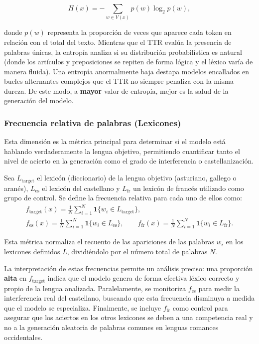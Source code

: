 \[
H(x) = -\sum_{w \in V(x)} p(w)\log_2 p(w),
\]

donde $p(w)$ representa la proporción de veces que aparece cada token en relación con el total del texto. Mientras que el TTR evalúa la presencia de palabras únicas, la entropía analiza si su distribución probabilística es natural (donde los artículos y preposiciones se repiten de forma lógica y el léxico varía de manera fluida). Una entropía anormalmente baja destapa modelos encallados en bucles alternantes complejos que el TTR no siempre penaliza con la misma dureza. De este modo, a \textbf{mayor} valor de entropía, mejor es la salud de la generación del modelo.

\subsubsection{Frecuencia relativa de palabras (Lexicones)}

Esta dimensión es la métrica principal para determinar si el modelo está hablando verdaderamente la lengua objetivo, permitiendo cuantificar tanto el nivel de acierto en la generación como el grado de interferencia o castellanización.

Sea $L_{\text{target}}$ el lexicón (diccionario) de la lengua objetivo (asturiano, gallego o aranés), $L_{\text{es}}$ el lexicón del castellano y $L_{\text{fr}}$ un lexicón de francés utilizado como grupo de control. Se define la frecuencia relativa para cada uno de ellos como:
\begin{gather*}
f_{\text{target}}(x) = \frac{1}{N}\sum_{i=1}^N \mathbf{1}\{w_i \in L_{\text{target}}\}, \\
f_{\text{es}}(x) = \frac{1}{N}\sum_{i=1}^N \mathbf{1}\{w_i \in L_{\text{es}}\}, \qquad
f_{\text{fr}}(x) = \frac{1}{N}\sum_{i=1}^N \mathbf{1}\{w_i \in L_{\text{fr}}\}.
\end{gather*}

Esta métrica normaliza el recuento de las apariciones de las palabras $w_i$ en los lexicones definidos $L$, dividiéndolo por el número total de palabras $N$.

La interpretación de estas frecuencias permite un análisis preciso: una proporción \textbf{alta} en $f_{\text{target}}$ indica que el modelo genera de forma efectiva léxico correcto y propio de la lengua analizada. Paralelamente, se monitoriza $f_{\text{es}}$ para medir la interferencia real del castellano, buscando que esta frecuencia disminuya a medida que el modelo se especializa. Finalmente, se incluye $f_{\text{fr}}$ como control para asegurar que los aciertos en los otros lexicones se deben a una competencia real y no a la generación aleatoria de palabras comunes en lenguas romances occidentales.

